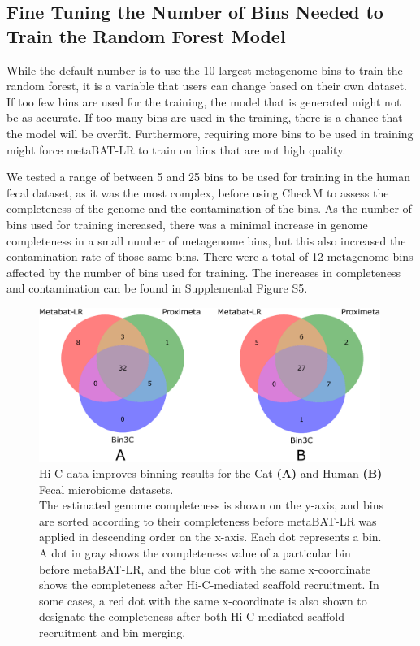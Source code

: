 \documentclass[fleqn,10pt,lineno]{wlpeerj}
\providecommand{\DIFaddtex}[1]{{\protect\color{blue}\uwave{#1}}} %
\providecommand{\DIFdeltex}[1]{{\protect\color{red}\sout{#1}}}                      %
\providecommand{\DIFaddbegin}{} %
\providecommand{\DIFaddend}{} %
\providecommand{\DIFdelbegin}{} %
\providecommand{\DIFdelend}{} %
\providecommand{\DIFadd}[1]{\texorpdfstring{\DIFaddtex{#1}}{#1}} %
\providecommand{\DIFdel}[1]{\texorpdfstring{\DIFdeltex{#1}}{}} %
\newcommand{\DIFscaledelfig}{0.5}
\newlength{\DIFdelgraphicswidth} %
\newlength{\DIFdelgraphicsheight} %
\newcommand{\DIFaddincludegraphics}[2][]{{\color{blue}\fbox{\DIFOincludegraphics[#1]{#2}}}} %
\newcommand{\DIFdelincludegraphics}[2][]{%
\sbox{\DIFdelgraphicsbox}{\DIFOincludegraphics[#1]{#2}}%
\settoboxwidth{\DIFdelgraphicswidth}{\DIFdelgraphicsbox} %
\settoboxtotalheight{\DIFdelgraphicsheight}{\DIFdelgraphicsbox} %
\scalebox{\DIFscaledelfig}{%
\parbox[b]{\DIFdelgraphicswidth}{\usebox{\DIFdelgraphicsbox}\\[-\baselineskip] \rule{\DIFdelgraphicswidth}{0em}}\llap{\resizebox{\DIFdelgraphicswidth}{\DIFdelgraphicsheight}{%
\setlength{\unitlength}{\DIFdelgraphicswidth}%
\begin{picture}(1,1)%
\thicklines\linethickness{2pt} %
{\color[rgb]{1,0,0}\put(0,0){\framebox(1,1){}}}%
{\color[rgb]{1,0,0}\put(0,0){\line( 1,1){1}}}%
{\color[rgb]{1,0,0}\put(0,1){\line(1,-1){1}}}%
\end{picture}%
}\hspace*{3pt}}} %
} %
\DeclareRobustCommand{\DIFaddbegin}{\DIFOaddbegin \let\includegraphics\DIFaddincludegraphics} %
\DeclareRobustCommand{\DIFaddend}{\DIFOaddend \let\includegraphics\DIFOincludegraphics} %
\DeclareRobustCommand{\DIFdelbegin}{\DIFOdelbegin \let\includegraphics\DIFdelincludegraphics} %
\DeclareRobustCommand{\DIFdelend}{\DIFOaddend \let\includegraphics\DIFOincludegraphics} %
\begin{document}
\subsection*{Fine Tuning the Number of Bins Needed to Train the Random Forest Model}
While the default number is to use the 10 largest metagenome bins to train the random forest, it is a variable that users can change based on their own dataset. If too few bins are used for the training, the model that is generated might not be as accurate. If too many bins are used in the training, there is a chance that the model will be overfit. Furthermore, requiring more bins to be used in training might force metaBAT-LR to train on bins that are not high quality. 

We tested a range of between 5 and 25 bins to be used for training in the human fecal dataset, as it was the most complex, before using CheckM to assess the completeness of the genome and the contamination of the bins.  As the number of bins used for training increased, there was a minimal increase in genome completeness in a small number of metagenome bins, but this also increased the contamination rate of those same bins. There were a total of 12 metagenome bins affected by the number of bins used for training. The increases in completeness and contamination can be found in Supplemental Figure \DIFdelbegin \DIFdel{S5}\DIFdelend \DIFaddbegin \DIFadd{S6}\DIFaddend .     


\begin{figure}[ht!]
	\centering
	\includegraphics[width=0.99\textwidth]{Fig4.pdf}
	\caption{Hi-C data improves binning results for the Cat \textbf{(A)} and Human \textbf{(B)} Fecal microbiome datasets.
    \\ The estimated genome completeness is shown on the y-axis, and bins are sorted according to their completeness before metaBAT-LR was applied in descending order on the x-axis. Each dot represents a bin. A dot in gray shows the completeness value of a particular bin before metaBAT-LR, and the blue dot with the same x-coordinate shows the completeness after Hi-C-mediated scaffold recruitment. In some cases, a red dot with the same x-coordinate is also shown to designate the completeness after both Hi-C-mediated scaffold recruitment and bin merging. }
	\label{fig:Cat_and_human}
\end{figure}
\end{document}
